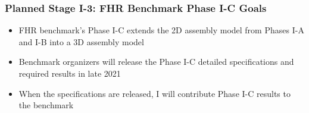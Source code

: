 \begin{frame}
    \frametitle{Planned Stage I-3: FHR Benchmark Phase I-C Goals}
        \begin{itemize}
            \item FHR benchmark's Phase I-C extends the 2D assembly model from 
            Phases I-A and I-B into a 3D assembly model
            \item Benchmark organizers will release the Phase I-C detailed 
            specifications and required results in late 2021
            \item When the specifications are released, I will contribute Phase I-C
            results to the benchmark
        \end{itemize}
\end{frame}